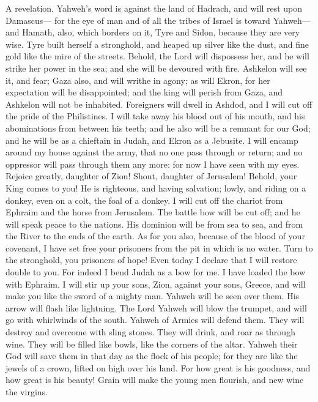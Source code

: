  A revelation. Yahweh's word is against the land of
Hadrach, and will rest upon Damascus--- for the eye of man and of all
the tribes of Israel is toward Yahweh---  and Hamath,
also, which borders on it, Tyre and Sidon, because they are very wise.
 Tyre built herself a stronghold, and heaped up silver
like the dust, and fine gold like the mire of the streets.
 Behold, the Lord will dispossess her, and he will strike
her power in the sea; and she will be devoured with fire. 
Ashkelon will see it, and fear; Gaza also, and will writhe in agony; as
will Ekron, for her expectation will be disappointed; and the king will
perish from Gaza, and Ashkelon will not be inhabited. 
Foreigners will dwell in Ashdod, and I will cut off the pride of the
Philistines.  I will take away his blood out of his mouth,
and his abominations from between his teeth; and he also will be a
remnant for our God; and he will be as a chieftain in Judah, and Ekron
as a Jebusite.  I will encamp around my house against the
army, that no one pass through or return; and no oppressor will pass
through them any more: for now I have seen with my eyes. 
Rejoice greatly, daughter of Zion! Shout, daughter of Jerusalem! Behold,
your King comes to you! He is righteous, and having salvation; lowly,
and riding on a donkey, even on a colt, the foal of a donkey.
 I will cut off the chariot from Ephraim and the horse
from Jerusalem. The battle bow will be cut off; and he will speak peace
to the nations. His dominion will be from sea to sea, and from the River
to the ends of the earth.  As for you also, because of
the blood of your covenant, I have set free your prisoners from the pit
in which is no water.  Turn to the stronghold, you
prisoners of hope! Even today I declare that I will restore double to
you.  For indeed I bend Judah as a bow for me. I have
loaded the bow with Ephraim. I will stir up your sons, Zion, against
your sons, Greece, and will make you like the sword of a mighty man.
 Yahweh will be seen over them. His arrow will flash like
lightning. The Lord Yahweh will blow the trumpet, and will go with
whirlwinds of the south.  Yahweh of Armies will defend
them. They will destroy and overcome with sling stones. They will drink,
and roar as through wine. They will be filled like bowls, like the
corners of the altar.  Yahweh their God will save them in
that day as the flock of his people; for they are like the jewels of a
crown, lifted on high over his land.  For how great is
his goodness, and how great is his beauty! Grain will make the young men
flourish, and new wine the virgins.

